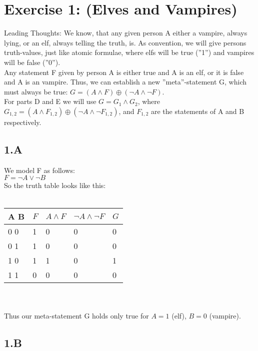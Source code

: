 \documentclass[12pt]{article}
\begin{document}
 

\rhead{\today}


\section*{Exercise 1: (Elves and Vampires)}

Leading Thoughts: We know, that any given person A either a vampire, always lying, or an elf, always telling the truth, is. As convention, we will give persons truth-values, just like atomic formulae, where elfs will be true (''1'') and vampires will be false (''0'').\\
Any statement F given by person A is either true and A is an elf, or it is false and A is an vampire. Thus, we can establish a new ''meta''-statement G, which must always be true: $G = (A \land F) \oplus ( \neg A \land \neg F )$.\\
For parts D and E we will use $G = G_1 \land G_2$, where $G_{1,2} = (A \land F_{1,2}) \oplus ( \neg A \land \neg F_{1,2} ) $, and $F_{1,2}$ are the statements of A and B respectively.

\subsection*{1.A}

We model F as follows:\\
$F = \neg A \lor \neg B$ \\
So the truth table looks like this:\\\\
\begin{tabular}{  l | l | l | l | l}
	A B & $F$ & $A \land F $ & $\neg A \land \neg F$ & $G$ \\ \hline
	0 0 & 1 & 0 & 0 & 0 \\
	0 1 & 1 & 0 & 0 & 0 \\
	1 0 & 1 & 1 & 0 & 1 \\
	1 1 & 0 & 0 & 0 & 0 \\
\end{tabular} \\\\
Thus our meta-statement G holds only true for $A=1$ (elf), $B=0$ (vampire).

\subsection*{1.B}
\end{document}
